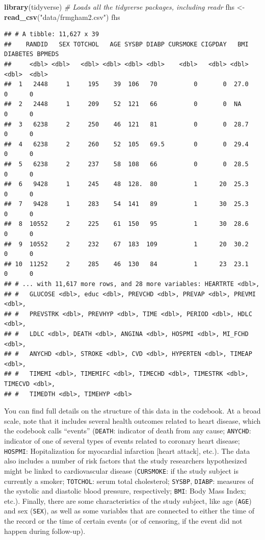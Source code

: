 \documentclass[
]{book}
\newenvironment{Shaded}{\begin{snugshade}}{\end{snugshade}}
\newcommand{\CommentTok}[1]{\textcolor[rgb]{0.56,0.35,0.01}{\textit{#1}}}
\newcommand{\KeywordTok}[1]{\textcolor[rgb]{0.13,0.29,0.53}{\textbf{#1}}}
\newcommand{\NormalTok}[1]{#1}
\newcommand{\StringTok}[1]{\textcolor[rgb]{0.31,0.60,0.02}{#1}}
\begin{document}
\begin{Shaded}
\begin{Highlighting}[]
\KeywordTok{library}\NormalTok{(tidyverse) }\CommentTok{# Loads all the tidyverse packages, including readr}
\NormalTok{fhs <-}\StringTok{ }\KeywordTok{read_csv}\NormalTok{(}\StringTok{"data/frmgham2.csv"}\NormalTok{)}
\NormalTok{fhs}
\end{Highlighting}
\end{Shaded}

\begin{verbatim}
## # A tibble: 11,627 x 39
##    RANDID   SEX TOTCHOL   AGE SYSBP DIABP CURSMOKE CIGPDAY   BMI DIABETES BPMEDS
##     <dbl> <dbl>   <dbl> <dbl> <dbl> <dbl>    <dbl>   <dbl> <dbl>    <dbl>  <dbl>
##  1   2448     1     195    39  106   70          0       0  27.0        0      0
##  2   2448     1     209    52  121   66          0       0  NA          0      0
##  3   6238     2     250    46  121   81          0       0  28.7        0      0
##  4   6238     2     260    52  105   69.5        0       0  29.4        0      0
##  5   6238     2     237    58  108   66          0       0  28.5        0      0
##  6   9428     1     245    48  128.  80          1      20  25.3        0      0
##  7   9428     1     283    54  141   89          1      30  25.3        0      0
##  8  10552     2     225    61  150   95          1      30  28.6        0      0
##  9  10552     2     232    67  183  109          1      20  30.2        0      0
## 10  11252     2     285    46  130   84          1      23  23.1        0      0
## # ... with 11,617 more rows, and 28 more variables: HEARTRTE <dbl>,
## #   GLUCOSE <dbl>, educ <dbl>, PREVCHD <dbl>, PREVAP <dbl>, PREVMI <dbl>,
## #   PREVSTRK <dbl>, PREVHYP <dbl>, TIME <dbl>, PERIOD <dbl>, HDLC <dbl>,
## #   LDLC <dbl>, DEATH <dbl>, ANGINA <dbl>, HOSPMI <dbl>, MI_FCHD <dbl>,
## #   ANYCHD <dbl>, STROKE <dbl>, CVD <dbl>, HYPERTEN <dbl>, TIMEAP <dbl>,
## #   TIMEMI <dbl>, TIMEMIFC <dbl>, TIMECHD <dbl>, TIMESTRK <dbl>, TIMECVD <dbl>,
## #   TIMEDTH <dbl>, TIMEHYP <dbl>
\end{verbatim}

You can find full details on the structure of this data in the codebook. At a broad scale, note that it includes several health outcomes related to heart disease, which the codebook calls ``events'' (\texttt{DEATH}: indicator of death from any cause; \texttt{ANYCHD}: indicator of one of several types of events related to coronary heart disease; \texttt{HOSPMI}: Hopitalization for myocardial infarction {[}heart attack{]}, etc.). The data also includes a number of risk factors that the study researchers hypothesized might be linked to cardiovascular disease (\texttt{CURSMOKE}: if the study subject is currently a smoker; \texttt{TOTCHOL}: serum total cholesterol; \texttt{SYSBP}, \texttt{DIABP}: measures of the systolic and diastolic blood pressure, respectively; \texttt{BMI}: Body Mass Index; etc.). Finally, there are some characteristics of the study subject, like age (\texttt{AGE}) and sex (\texttt{SEX}), as well as some variables that are connected to either the time of the record or the time of certain events (or of censoring, if the event did not happen during follow-up).
\end{document}
